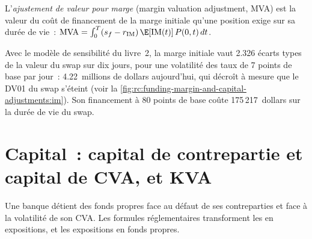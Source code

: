 \begin{definition}\label{def:rc:funding-margin-and-capital-adjustments:mva}
L'\emph{ajustement de valeur pour marge} (margin valuation adjustment, MVA) est la
valeur du coût de financement de la marge initiale qu'une position exige sur sa durée de vie~:
$\mathrm{MVA} = \int_0^T(s_f-r_{\mathrm{IM}})\,\E[\mathrm{IM}(t)]\,P(0,t)\,dt$.
\end{definition}

\begin{example}\label{ex:rc:funding-margin-and-capital-adjustments:mva}
Avec le modèle de sensibilité du livre~2, la marge initiale vaut 2.326 écarts types de la valeur du
swap sur dix jours, pour une volatilité des taux de 7 points de base par jour~: 4.22~millions de dollars aujourd'hui,
qui décroît à mesure que le DV01 du swap s'éteint (voir la \cref{fig:rc:funding-margin-and-capital-adjustments:im}).
Son financement à 80 points de base coûte 175\,217~dollars sur la durée de vie du swap.
\end{example}

\begin{omfigure}

\label{fig:rc:funding-margin-and-capital-adjustments:im}
\end{omfigure}

\section{Capital~: capital de contrepartie et capital de CVA, et KVA}

Une banque détient des fonds propres face au défaut de ses contreparties et face à la volatilité
de son CVA. Les formules réglementaires transforment les  en expositions, et les expositions en fonds propres.

